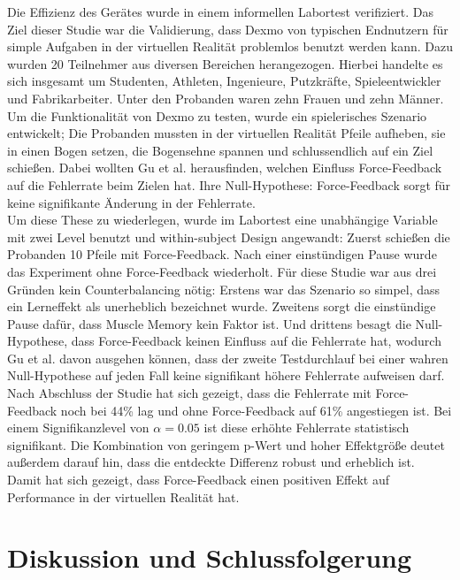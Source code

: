 Die Effizienz des Gerätes wurde in einem informellen Labortest verifiziert. Das Ziel dieser Studie war die Validierung, dass Dexmo von typischen Endnutzern für simple Aufgaben in der virtuellen Realität problemlos benutzt werden kann. Dazu wurden 20 Teilnehmer aus diversen Bereichen herangezogen. Hierbei handelte es sich insgesamt um Studenten, Athleten, Ingenieure, Putzkräfte, Spieleentwickler und Fabrikarbeiter. Unter den Probanden waren zehn Frauen und zehn Männer.\\
Um die Funktionalität von Dexmo zu testen, wurde ein spielerisches Szenario entwickelt; Die Probanden mussten in der virtuellen Realität Pfeile aufheben, sie in einen Bogen setzen, die Bogensehne spannen und schlussendlich auf ein Ziel schießen. Dabei wollten Gu et al. herausfinden, welchen Einfluss Force-Feedback auf die Fehlerrate beim Zielen hat. Ihre Null-Hypothese: Force-Feedback sorgt für keine signifikante Änderung in der Fehlerrate.\\
Um diese These zu wiederlegen, wurde im Labortest eine unabhängige Variable mit zwei Level benutzt und within-subject Design angewandt: Zuerst schießen die Probanden 10 Pfeile mit Force-Feedback. Nach einer einstündigen Pause wurde das Experiment ohne Force-Feedback wiederholt. Für diese Studie war aus drei Gründen kein Counterbalancing nötig: Erstens war das Szenario so simpel, dass ein Lerneffekt als unerheblich bezeichnet wurde. Zweitens sorgt die einstündige Pause dafür, dass Muscle Memory kein Faktor ist. Und drittens besagt die Null-Hypothese, dass Force-Feedback keinen Einfluss auf die Fehlerrate hat, wodurch Gu et al. davon ausgehen können, dass der zweite Testdurchlauf bei einer wahren Null-Hypothese auf jeden Fall keine signifikant höhere Fehlerrate aufweisen darf. \\
Nach Abschluss der Studie hat sich gezeigt, dass die Fehlerrate mit Force-Feedback noch bei 44\% lag und ohne Force-Feedback auf 61\% angestiegen ist. Bei einem Signifikanzlevel von $\alpha = 0.05$ ist diese erhöhte Fehlerrate statistisch signifikant. Die Kombination von geringem p-Wert und hoher Effektgröße deutet außerdem darauf hin, dass die entdeckte Differenz robust und erheblich ist. Damit hat sich gezeigt, dass Force-Feedback einen positiven Effekt auf Performance in der virtuellen Realität hat. 

\chapter{Diskussion und Schlussfolgerung}\label{Diskussion und Schlussfolgerung}

